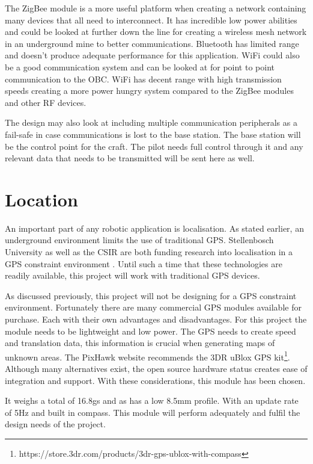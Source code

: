 		The ZigBee module is a more useful platform when creating a network containing many devices that all need to interconnect. It has incredible low power abilities and could be looked at further down the line for creating a wireless mesh network in an underground mine to better communications. Bluetooth has limited range and doesn't produce adequate performance for this application. WiFi could also be a good communication system and can be looked at for point to point communication to the OBC. WiFi has decent range with high transmission speeds creating a more power hungry system compared to the ZigBee modules and other RF devices.
		
		The design may also look at including multiple communication peripherals as a fail-safe in case communications is lost to the base station. The base station will be the control point for the craft. The pilot needs full control through it and any relevant data that needs to be transmitted will be sent here as well.
		
		

		
		\section{Location}
		An important part of any robotic application is localisation. As stated earlier, an underground environment limits the use of traditional GPS. Stellenbosch University as well as the CSIR are both funding research into localisation in a GPS constraint environment . Until such a time that these technologies are readily available, this project will work with traditional GPS devices.
			
		As discussed previously, this project will not be designing for a GPS constraint environment. Fortunately there are many commercial  GPS modules available for purchase. Each with their own advantages and disadvantages. For this project the module needs to be lightweight and low power. The GPS needs to create speed and translation data, this information is crucial when generating maps of unknown areas. The PixHawk website recommends the 3DR uBlox GPS kit\footnote{https://store.3dr.com/products/3dr-gps-ublox-with-compass}. Although many alternatives exist, the open source hardware status creates ease of integration and support. With these considerations, this module has been chosen.
			
		It weighs a total of 16.8gs and as has a low 8.5mm profile. With an update rate of 5Hz and built in compass. This module will perform adequately and fulfil the design needs of the project.
			 
